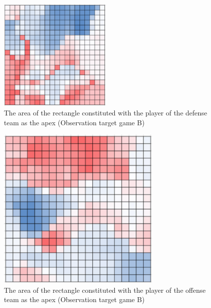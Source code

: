 \begin{figure}[htb]
  \begin{center}
    \includegraphics[clip,height=5.5cm]{figure/The_area_of_the_rectangle_constituted_with_the_player_of_the_defense_team_as_the_apex_Observation_target_game_B.eps}
\caption{The area of the rectangle constituted with the player of the defense team 
as the apex (Observation target game B)}
    \label{fig:SOM_result06}
  \end{center}
\end{figure}

\begin{figure}[htb]
  \begin{center}
    \includegraphics[clip,height=8.0cm]{figure/The_area_of_the_rectangle_constituted_with_the_player_of_the_offense_team_as_the_apex_Observation_target_game_B.eps}
    \caption{The area of the rectangle constituted with the player of the offense team
 as the apex (Observation target game B)}
    \label{fig:SOM_result07}
  \end{center}
\end{figure}

